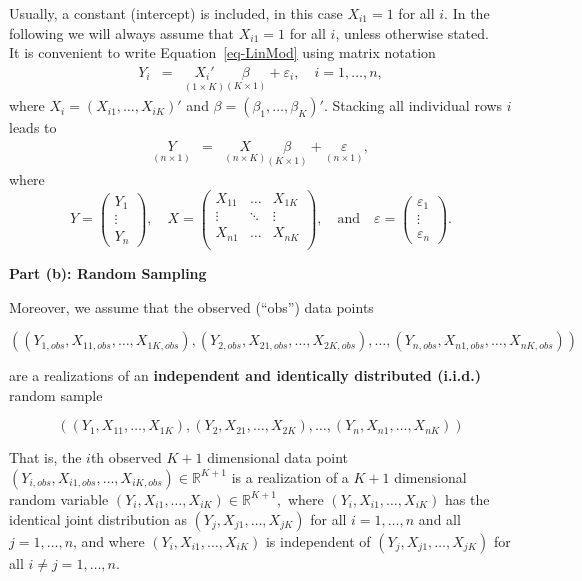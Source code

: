 \documentclass[
  letterpaper,
  DIV=11,
  numbers=noendperiod]{scrreprt}
\theoremstyle{definition}
\theoremstyle{plain}
\theoremstyle{plain}
\theoremstyle{remark}
\begin{document}
Usually, a constant (intercept) is included, in this case \(X_{i1}=1\)
for all \(i\). In the following we will always assume that \(X_{i1}=1\)
for all \(i\), unless otherwise stated.\\
It is convenient to write Equation~\ref{eq-LinMod} using matrix notation
\begin{eqnarray*}
  Y_i&=&\underset{(1\times K)}{X_i'}\underset{(K\times 1)}{\beta} +\varepsilon_i, \quad i=1,\dots,n,
\end{eqnarray*} where \(X_i=(X_{i1},\dots,X_{iK})'\) and
\(\beta=(\beta_1,\dots,\beta_K)'\). Stacking all individual rows \(i\)
leads to \begin{eqnarray*}\label{LM}
  \underset{(n\times 1)}{Y}&=&\underset{(n\times K)}{X}\underset{(K\times 1)}{\beta} + \underset{(n\times 1)}{\varepsilon},
\end{eqnarray*} where \begin{equation*}
Y=\left(\begin{matrix}Y_1\\ \vdots\\Y_n\end{matrix}\right),\quad X=\left(\begin{matrix}X_{11}&\dots&X_{1K}\\\vdots&\ddots&\vdots\\ X_{n1}&\dots&X_{nK}\\\end{matrix}\right),\quad\text{and}\quad \varepsilon=\left(\begin{matrix}\varepsilon_1\\ \vdots\\ \varepsilon_n\end{matrix}\right).
\end{equation*}

\textbf{Part (b): Random Sampling}

Moreover, we assume that the observed (``obs'') data points

\[
((Y_{1,obs},X_{11,obs},\dots,X_{1K,obs}),(Y_{2,obs},X_{21,obs},\dots,X_{2K,obs}),\dots,(Y_{n,obs},X_{n1,obs},\dots,X_{nK,obs}))
\]

are a realizations of an \textbf{independent and identically distributed
(i.i.d.)} random sample

\[
((Y_{1},X_{11},\dots,X_{1K}),(Y_{2},X_{21},\dots,X_{2K}),\dots,(Y_{n},X_{n1},\dots,X_{nK}))
\]

That is, the \(i\)th observed \(K+1\) dimensional data point
\((Y_{i,obs},X_{i1,obs},\dots,X_{iK,obs})\in\mathbb{R}^{K+1}\) is a
realization of a \(K+1\) dimensional random variable
\((Y_{i},X_{i1},\dots,X_{iK})\in\mathbb{R}^{K+1},\) where
\((Y_{i},X_{i1},\dots,X_{iK})\) has the identical joint distribution as
\((Y_{j},X_{j1},\dots,X_{jK})\) for all \(i=1,\dots,n\) and all
\(j=1,\dots,n\), and where \((Y_{i},X_{i1},\dots,X_{iK})\) is
independent of \((Y_{j},X_{j1},\dots,X_{jK})\) for all
\(i\neq j=1,\dots,n.\)
\end{document}
